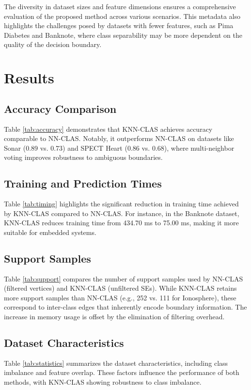 \documentclass[conference]{IEEEtran}
\begin{document}
The diversity in dataset sizes and feature dimensions ensures a comprehensive evaluation of the proposed method across various scenarios. This metadata also highlights the challenges posed by datasets with fewer features, such as Pima Diabetes and Banknote, where class separability may be more dependent on the quality of the decision boundary.

\section{Results}

\subsection{Accuracy Comparison}

Table \ref{tab:accuracy} demonstrates that KNN-CLAS achieves accuracy comparable to NN-CLAS. Notably, it outperforms NN-CLAS on datasets like Sonar (0.89 vs. 0.73) and SPECT Heart (0.86 vs. 0.68), where multi-neighbor voting improves robustness to ambiguous boundaries.

\subsection{Training and Prediction Times}

Table \ref{tab:timing} highlights the significant reduction in training time achieved by KNN-CLAS compared to NN-CLAS. For instance, in the Banknote dataset, KNN-CLAS reduces training time from 434.70 ms to 75.00 ms, making it more suitable for embedded systems.

\subsection{Support Samples}

Table \ref{tab:support} compares the number of support samples used by NN-CLAS (filtered vertices) and KNN-CLAS (unfiltered SEs). While KNN-CLAS retains more support samples than NN-CLAS (e.g., 252 vs. 111 for Ionosphere), these correspond to inter-class edges that inherently encode boundary information. The increase in memory usage is offset by the elimination of filtering overhead.

\subsection{Dataset Characteristics}

Table \ref{tab:statistics} summarizes the dataset characteristics, including class imbalance and feature overlap. These factors influence the performance of both methods, with KNN-CLAS showing robustness to class imbalance.
\end{document}
